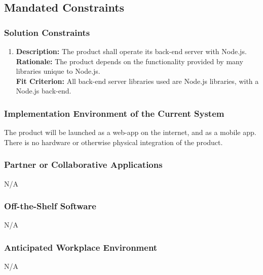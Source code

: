 \documentclass[12pt]{article}
\begin{document}
\subsection{Mandated Constraints} 
\subsubsection{Solution Constraints}
\begin{enumerate}
	\item
	\textbf{Description: } The product shall operate its back-end server with Node.js. \\
	\textbf{Rationale: } The product depends on the functionality provided by many libraries unique to Node.js. \\
	\textbf{Fit Criterion: } All back-end server libraries used are Node.js libraries, with a Node.js back-end. \\
\end{enumerate}
\subsubsection{Implementation Environment of the Current System}
The product will be launched as a web-app on the internet, and as a mobile app. There is no hardware or otherwise physical integration of the product.
\subsubsection{Partner or Collaborative Applications}
N/A
\subsubsection{Off-the-Shelf Software}
N/A
\subsubsection{Anticipated Workplace Environment}
N/A
\end{document}
